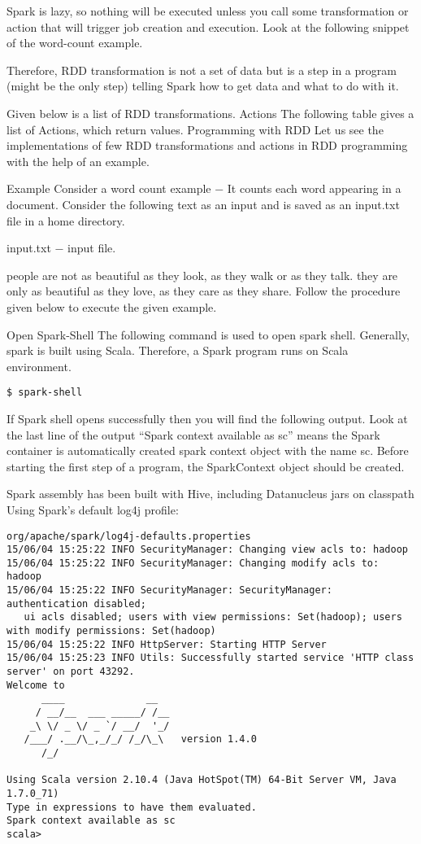 \documentclass[a4paper,12pt]{article}
\begin{document}
Spark is lazy, so nothing will be executed unless you call some transformation or action that will trigger job creation and execution. Look at the following snippet of the word-count example.

Therefore, RDD transformation is not a set of data but is a step in a program (might be the only step) telling Spark how to get data and what to do with it.

Given below is a list of RDD transformations.
Actions
The following table gives a list of Actions, which return values.
Programming with RDD
Let us see the implementations of few RDD transformations and actions in RDD programming with the help of an example.

Example
Consider a word count example − It counts each word appearing in a document. Consider the following text as an input and is saved as an input.txt file in a home directory.

input.txt − input file.

people are not as beautiful as they look, 
as they walk or as they talk.
they are only as beautiful  as they love, 
as they care as they share.
Follow the procedure given below to execute the given example.

Open Spark-Shell
The following command is used to open spark shell. Generally, spark is built using Scala. Therefore, a Spark program runs on Scala environment.
\begin{verbatim}
$ spark-shell
\end{verbatim}

If Spark shell opens successfully then you will find the following output. Look at the last line of the output “Spark context available as sc” means the Spark container is automatically created spark context object with the name sc. Before starting the first step of a program, the SparkContext object should be created.

Spark assembly has been built with Hive, including Datanucleus jars on classpath 
Using Spark's default log4j profile:
\begin{verbatim}
org/apache/spark/log4j-defaults.properties 
15/06/04 15:25:22 INFO SecurityManager: Changing view acls to: hadoop 
15/06/04 15:25:22 INFO SecurityManager: Changing modify acls to: hadoop 
15/06/04 15:25:22 INFO SecurityManager: SecurityManager: authentication disabled;
   ui acls disabled; users with view permissions: Set(hadoop); users with modify permissions: Set(hadoop) 
15/06/04 15:25:22 INFO HttpServer: Starting HTTP Server 
15/06/04 15:25:23 INFO Utils: Successfully started service 'HTTP class server' on port 43292. 
Welcome to 
      ____              __ 
     / __/__  ___ _____/ /__ 
    _\ \/ _ \/ _ `/ __/  '_/ 
   /___/ .__/\_,_/_/ /_/\_\   version 1.4.0 
      /_/  
		
Using Scala version 2.10.4 (Java HotSpot(TM) 64-Bit Server VM, Java 1.7.0_71) 
Type in expressions to have them evaluated. 
Spark context available as sc 
scala>
\end{verbatim}
\end{document}
